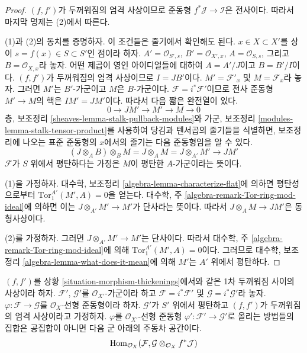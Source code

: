 \begin{proof}
$(f, f')$가 두꺼워짐의 엄격 사상이므로 준동형
$f^*\mathcal{J} \to \mathcal{I}$은 전사이다. 따라서 마지막 명제는
(2)에서 따른다.

\medskip\noindent
(1)과 (2)의 동치를 증명하자. 이 조건들은 줄기에서 확인해도 된다.
$x \in X \subset X'$를 상이 $s = f(x) \in S \subset S'$인 점이라 하자.
$A' = \mathcal{O}_{S', s}$, $B' = \mathcal{O}_{X', x}$,
$A = \mathcal{O}_{S, s}$, 그리고 $B = \mathcal{O}_{X, x}$라 놓자.
어떤 제곱이 영인 아이디얼들에 대하여 $A = A'/J$이고 $B = B'/I$이다.
$(f, f')$가 두꺼워짐의 엄격 사상이므로 $I = JB'$이다.
$M' = \mathcal{F}'_x$ 및 $M = \mathcal{F}_x$라 놓자. 그러면
$M'$는 $B'$-가군이고 $M$은 $B$-가군이다.
$\mathcal{F} = i^*\mathcal{F}'$이므로 전사 준동형 $M' \to M$의 핵은
$IM' = JM'$이다. 따라서 다음 짧은 완전열이 있다.
$$
0 \to JM' \to M' \to M \to 0
$$
층, 보조정리 \ref{sheaves-lemma-stalk-pullback-modules}와
가군, 보조정리 \ref{modules-lemma-stalk-tensor-product}를 사용하여
당김과 텐서곱의 줄기들을 식별하면, 보조정리에 나오는 표준 준동형의
$x$에서의 줄기는 다음 준동형임을 알 수 있다.
$$
(J \otimes_A B) \otimes_B M = J \otimes_A M = J \otimes_{A'} M'
\longrightarrow JM'
$$
$\mathcal{F}$가 $S$ 위에서 평탄하다는 가정은 $M$이 평탄한
$A$-가군이라는 뜻이다.

\medskip\noindent
(1)을 가정하자. 대수학, 보조정리
\ref{algebra-lemma-characterize-flat}에 의하면 평탄성으로부터
$\text{Tor}_1^{A'}(M', A) = 0$을 얻는다. 대수학, 주
\ref{algebra-remark-Tor-ring-mod-ideal}에 의하면 이는
$J \otimes_{A'} M' \to M'$가 단사라는 뜻이다. 따라서
$J \otimes_A M \to JM'$은 동형사상이다.

\medskip\noindent
(2)를 가정하자. 그러면 $J \otimes_{A'} M' \to M'$는 단사이다.
따라서 대수학, 주 \ref{algebra-remark-Tor-ring-mod-ideal}에 의해
$\text{Tor}_1^{A'}(M', A) = 0$이다. 그러므로 대수학, 보조정리
\ref{algebra-lemma-what-does-it-mean}에 의해 $M'$는 $A'$ 위에서
평탄하다.
\end{proof}

\begin{lemma}
\label{lemma-inf-map-rel}
$(f, f')$를 상황 \ref{situation-morphism-thickenings}에서와 같은
1차 두꺼워짐 사이의 사상이라 하자. $\mathcal{F}'$, $\mathcal{G}'$를
$\mathcal{O}_{X'}$-가군이라 하고 $\mathcal{F} = i^*\mathcal{F}'$ 및
$\mathcal{G} = i^*\mathcal{G}'$라 놓자.
$\varphi : \mathcal{F} \to \mathcal{G}$를 $\mathcal{O}_X$-선형
준동형이라 하자. $\mathcal{G}'$가 $S'$ 위에서 평탄하고
$(f, f')$가 두꺼워짐의 엄격 사상이라고 가정하자. $\varphi$를
$\mathcal{O}_{X'}$-선형 준동형
$\varphi' : \mathcal{F}' \to \mathcal{G}'$로 올리는 방법들의 집합은
공집합이 아니면 다음 군 아래의 주동차 공간이다.
$$
\mathop{\mathrm{Hom}}\nolimits_{\mathcal{O}_X}(\mathcal{F},
\mathcal{G} \otimes_{\mathcal{O}_X} f^*\mathcal{J})
$$
\end{lemma}

